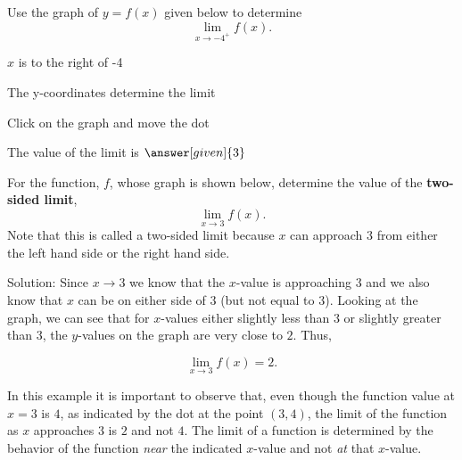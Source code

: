 \documentclass{ximera}
\begin{document}
\begin{problem} %




Use the graph of $y = f(x)$ given below to determine
  \[
  \lim_{x\to -4^+} f(x).
  \]
  
    \begin{hint}
      $x$ is to the right of -4
    \end{hint}
    \begin{hint}
      The y-coordinates determine the limit
    \end{hint}
		\begin{hint}
		  Click on the graph and move the dot
		\end{hint}
		The value of the limit is
		 $\answer[given]{3}$

\end{problem}


\begin{example} %
For the function, $f$, whose graph is shown below, determine the value of the \textbf{two-sided limit}, 
\[
\lim_{x\to 3} f(x).
\]
Note that this is called a two-sided limit because $x$ can 
approach $3$ from either the left hand side or the right hand side.



\vspace{.25in}
Solution: Since $x \to 3$ we know that the $x$-value is approaching $3$ and we also know 
that $x$ can be on either side of $3$ (but not equal to 3). 
Looking at the graph, we can see that for $x$-values either slightly less than $3$ or slightly greater than $3$, 
the $y$-values on the graph are very close to $2$. Thus, 

\[
\lim_{x\to 3} f(x) = 2.
\]

In this example it is important to observe that, even though the function value at $x= 3$ is $4$, 
as indicated by the dot at the point $(3,4)$, the limit of the function as $x$ approaches $3$ is $2$ and not $4$.  
The limit of a function is determined by the behavior of the function \textit{near} the 
indicated $x$-value and not \textit{at} that $x$-value.\\

\end{example}
\end{document}
